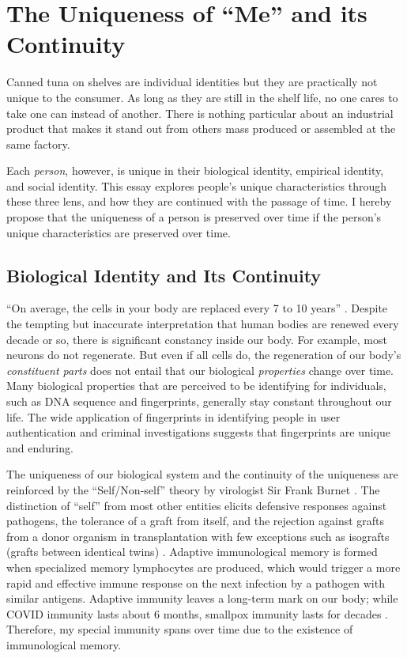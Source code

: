 \documentclass[a4paper,english,12pt]{scrartcl}
\begin{document}
\section{The Uniqueness of ``Me'' and its Continuity}

Canned tuna on shelves are individual identities but they are 
practically not unique to the consumer. As long as they are still
in the shelf life, no one cares to take one can instead of another.
There is nothing particular about an industrial product
that makes it stand out from others mass produced or assembled at
the same factory.

Each \emph{person}, however, is unique in their biological identity,
empirical identity, and social identity. This essay explores people's
unique characteristics through these three lens, and how they are
continued with the passage of time. I hereby propose that the uniqueness
of a person is preserved over time if the person's unique characteristics
are preserved over time.

\subsection{Biological Identity and Its Continuity}

``On average, the cells in your body are replaced every 7 to 10 years''
\parencite{what-cells}. Despite the tempting but inaccurate interpretation
that human bodies are renewed every decade or so, there is significant
constancy inside our body. For example, most neurons do not regenerate.
But even if all cells do, the regeneration of our body's \emph{constituent
parts} does not entail that our biological \emph{properties} change
over time. Many biological properties that are perceived to be identifying
for individuals, such as DNA sequence and fingerprints, generally
stay constant throughout our life. The wide application of fingerprints
in identifying people in user authentication and criminal investigations
suggests that fingerprints are unique and enduring.

The uniqueness of our biological system and the continuity of the
uniqueness are reinforced by the ``Self/Non-self'' theory by virologist
Sir Frank Burnet \parencite{BurnetFenner}. The distinction of ``self''
from most other entities elicits defensive responses against pathogens,
the tolerance of a graft from itself, and the rejection against grafts
from a donor organism in transplantation with few exceptions such
as isografts (grafts between identical twins) \parencite{pradeu2011limits}.
Adaptive immunological memory is formed when specialized memory lymphocytes
are produced, which would trigger a more rapid and effective immune
response on the next infection by a pathogen with similar antigens.
Adaptive immunity leaves a long-term mark on our body; while COVID
immunity lasts about 6 months, smallpox immunity lasts for decades
\parencite{Taub2008-ps}. Therefore, my special immunity spans over
time due to the existence of immunological memory.
\end{document}

